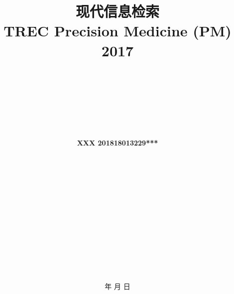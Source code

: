 \documentclass[a4paper]{article}
\begin{document}
\renewcommand{\contentsname}{目\ 录}
\renewcommand{\appendixname}{附录}
\renewcommand{\appendixpagename}{附录}
\renewcommand{\refname}{参考文献} 
\renewcommand{\figurename}{图}
\renewcommand{\tablename}{表}
\renewcommand{\today}{\number\year 年 \number\month 月 \number\day 日}
\begin{titlepage}
\title{{\Huge \textbf{现代信息检索}{\large\linebreak\\}}{\Large \textbf{TREC Precision Medicine (PM) 2017}\linebreak\linebreak}}


\author{\\ \\ \\ \\ \\ \\ \\
\textbf{XXX 201818013229***}  \\ \\
\\ \\ \\ \\ \\ \\ \\  \\ \\ \\ \\ \\}

\date{\today}

\maketitle
\thispagestyle{empty}
\end{titlepage}


\newpage

\thispagestyle{empty}
\begin{center}
\tableofcontents\label{c}
\end{center}
\setcounter{page}{0}
\thispagestyle{empty}
\newpage


\end{document}
